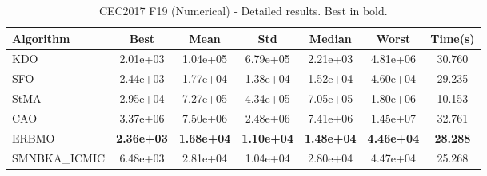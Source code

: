 \begin{table}[H]
\centering\small
\caption{CEC2017 F19 (Numerical) - Detailed results. Best in bold.}
\label{tab:cec2017_F19}
\begin{tabular}{lcccccc}
\toprule
\textbf{Algorithm} & \textbf{Best} & \textbf{Mean} & \textbf{Std} & \textbf{Median} & \textbf{Worst} & \textbf{Time(s)} \\
\midrule
KDO & 2.01e+03 & 1.04e+05 & 6.79e+05 & 2.21e+03 & 4.81e+06 & 30.760 \\
SFO & 2.44e+03 & 1.77e+04 & 1.38e+04 & 1.52e+04 & 4.60e+04 & 29.235 \\
StMA & 2.95e+04 & 7.27e+05 & 4.34e+05 & 7.05e+05 & 1.80e+06 & 10.153 \\
CAO & 3.37e+06 & 7.50e+06 & 2.48e+06 & 7.41e+06 & 1.45e+07 & 32.761 \\
ERBMO & \textbf{2.36e+03} & \textbf{1.68e+04} & \textbf{1.10e+04} & \textbf{1.48e+04} & \textbf{4.46e+04} & \textbf{28.288} \\
SMNBKA_ICMIC & 6.48e+03 & 2.81e+04 & 1.04e+04 & 2.80e+04 & 4.47e+04 & 25.268 \\
\bottomrule
\end{tabular}
\end{table}
